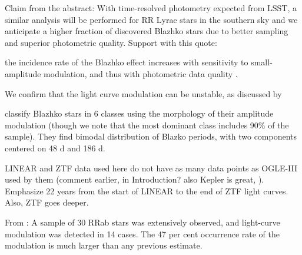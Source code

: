 Claim from the abstract: With time-resolved photometry expected from LSST, a similar analysis will be performed for
RR Lyrae stars in the southern sky and we anticipate a higher fraction of discovered Blazhko stars due to better sampling
and superior photometric quality.  Support with this quote:

the incidence rate of the Blazhko effect increases with sensitivity to small-amplitude modulation, and thus with
photometric data quality \citep{2009MNRAS.400.1006J}.

 
We confirm that the light curve modulation can be unstable, as discussed by \cite{2009MNRAS.400.1006J} 

\citep{2020MNRAS.494.1237S} classify Blazhko stars in 6 classes using the morphology of their amplitude modulation
(though we note that the most dominant class includes 90\% of the sample). They find bimodal distribution of Blazko periods, with two components
centered on 48 d and 186 d.

 LINEAR and ZTF data used here do not
 have as many data points as OGLE-III used by them (comment earlier, in Introduction? also Kepler is great, \citep{2010MNRAS.409.1585B}).
 Emphasize 22 years from the start of LINEAR to the end of ZTF light curves. Also, ZTF goes deeper.
 

From \cite{2009MNRAS.400.1006J}: A sample of 30 RRab stars was extensively observed, and light-curve modulation was detected in 14 cases. The 47 per cent occurrence rate of the modulation is much larger than any previous estimate. 
